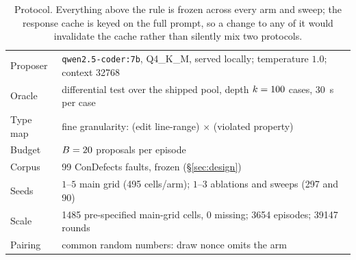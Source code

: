 \begin{table}[t]
\centering
\small
\caption{Protocol. Everything above the rule is frozen across every arm and
sweep; the response cache is keyed on the full prompt, so a change to any of
it would invalidate the cache rather than silently mix two protocols.}
\label{tab:protocol}
\setlength{\tabcolsep}{4pt}
\renewcommand{\arraystretch}{1.08}
\begin{tabular}{@{}L{2.3cm}L{5.5cm}@{}}
\toprule
Proposer & \texttt{qwen2.5-coder:7b}, Q4\_K\_M, served locally;
  temperature $1.0$; context \num{32768} \\
Oracle & differential test over the shipped pool, depth
  $k = 100$ cases, \SI{30}{\second} per case \\
Type map & fine granularity: (edit line-range) $\times$ (violated property) \\
Budget & $B = 20$ proposals per episode \\
Corpus & \num{99} ConDefects faults, frozen (\S\ref{sec:design}) \\
\midrule
Seeds & $1$--$5$ main grid (\num{495} cells/arm); $1$--$3$ ablations and
  sweeps (\num{297} and \num{90}) \\
Scale & \num{1485} pre-specified main-grid cells, $0$ missing;
  \num{3654} episodes; \num{39147} rounds \\
Pairing & common random numbers: draw nonce omits the arm \\
\bottomrule
\end{tabular}
\end{table}
